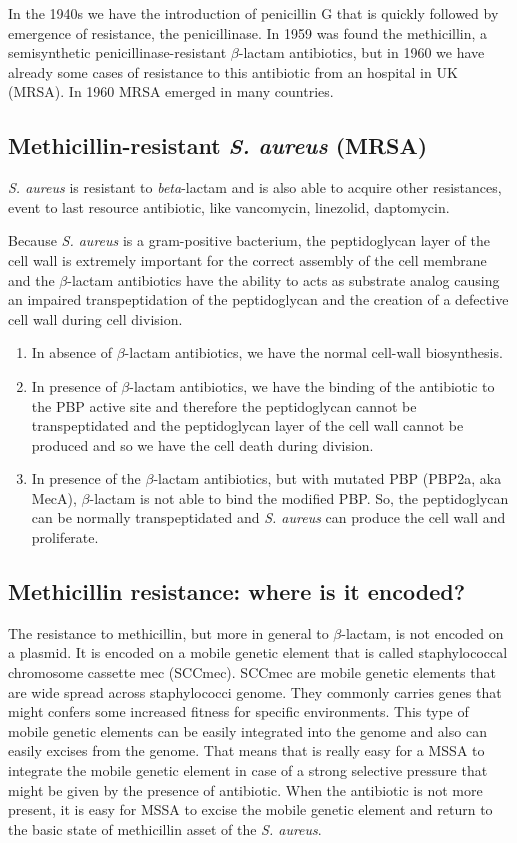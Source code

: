 In the 1940s we have the introduction of penicillin G that is quickly followed by emergence of resistance, the penicillinase. 
In 1959 was found the methicillin, a semisynthetic penicillinase-resistant $\beta$-lactam antibiotics, but in 1960 we have already some cases of resistance to this antibiotic from an hospital in UK (MRSA). In 1960 MRSA emerged in many countries. 

\subsection{Methicillin-resistant \emph{S. aureus} (MRSA)}

\emph{S. aureus} is resistant to \emph{beta}-lactam and is also able to acquire other resistances, event to last resource antibiotic, like vancomycin, linezolid, daptomycin.

Because \emph{S. aureus} is a gram-positive bacterium, the peptidoglycan layer of the cell wall is extremely important for the correct assembly of the cell membrane and the $\beta$-lactam antibiotics have the ability to acts as substrate analog causing an impaired transpeptidation of the peptidoglycan and the creation of a defective cell wall during cell division.

\begin{enumerate}
    \item In absence of $\beta$-lactam antibiotics, we have the normal cell-wall biosynthesis.
    \item In presence of $\beta$-lactam antibiotics, we have the binding of the antibiotic to the PBP active site and therefore the peptidoglycan cannot be transpeptidated and the peptidoglycan layer of the cell wall cannot be produced and so we have the cell death during division. 
    \item In presence of the $\beta$-lactam antibiotics, but with mutated PBP (PBP2a, aka MecA), $\beta$-lactam is not able to bind the modified PBP. So, the peptidoglycan can be normally transpeptidated and \emph{S. aureus} can produce the cell wall and proliferate. 
\end{enumerate}

\subsection{Methicillin resistance: where is it encoded?}

The resistance to methicillin, but more in general to $\beta$-lactam, is not encoded on a plasmid. It is encoded on a mobile genetic element that is called staphylococcal chromosome cassette mec (SCCmec). SCCmec are mobile genetic elements that are wide spread across staphylococci genome. They commonly carries genes that might confers some increased fitness for specific environments. This type of mobile genetic elements can be easily integrated into the genome and also can easily excises from the genome. That means that is really easy for a MSSA to integrate the mobile genetic element in case of a strong selective pressure that might be given by the presence of antibiotic. When the antibiotic is not more present, it is easy for MSSA to excise the mobile genetic element and return to the basic state of methicillin asset of the \emph{S. aureus}. 

